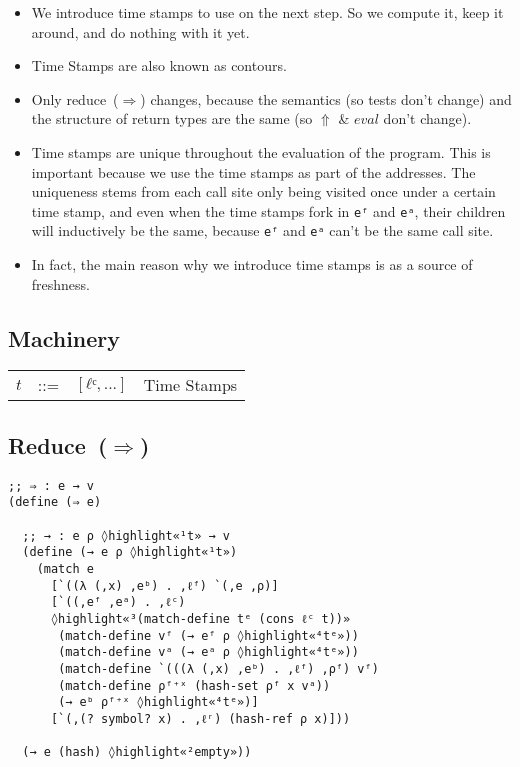 \documentclass[12pt, oneside]{book}
\begin{document}
\begin{itemize}
  \item We introduce time stamps to use on the next step. So we compute it, keep it around, and do nothing with it yet.
  \item Time Stamps are also known as contours.
  \item Only reduce~(\(⇒\)) changes, because the semantics (so tests don’t change) and the structure of return types are the same (so \(⇑\) \& \(eval\) don’t change).
  \item Time stamps are unique throughout the evaluation of the program. This is important because we use the time stamps as part of the addresses. The uniqueness stems from each call site only being visited once under a certain time stamp, and even when the time stamps fork in \texttt{eᶠ} and \texttt{eᵃ}, their children will inductively be the same, because \texttt{eᶠ} and \texttt{eᵃ} can’t be the same call site.
  \item In fact, the main reason why we introduce time stamps is as a source of freshness.
\end{itemize}

\subsection{Machinery}

\begin{tabular}{rcll}
  \(t\) & ::= & \([ℓᶜ, ...]\) & Time Stamps \\
\end{tabular}

\subsection{Reduce~(\(⇒\))}

\begin{Verbatim}
;; ⇒ : e → v
(define (⇒ e)

  ;; → : e ρ ◊highlight«¹t» → v
  (define (→ e ρ ◊highlight«¹t»)
    (match e
      [`((λ (,x) ,eᵇ) . ,ℓᶠ) `(,e ,ρ)]
      [`((,eᶠ ,eᵃ) . ,ℓᶜ)
      ◊highlight«³(match-define tᵉ (cons ℓᶜ t))»
       (match-define vᶠ (→ eᶠ ρ ◊highlight«⁴tᵉ»))
       (match-define vᵃ (→ eᵃ ρ ◊highlight«⁴tᵉ»))
       (match-define `(((λ (,x) ,eᵇ) . ,ℓᶠ) ,ρᶠ) vᶠ)
       (match-define ρᶠ⁺ˣ (hash-set ρᶠ x vᵃ))
       (→ eᵇ ρᶠ⁺ˣ ◊highlight«⁴tᵉ»)]
      [`(,(? symbol? x) . ,ℓʳ) (hash-ref ρ x)]))

  (→ e (hash) ◊highlight«²empty»))
\end{Verbatim}
\end{document}
